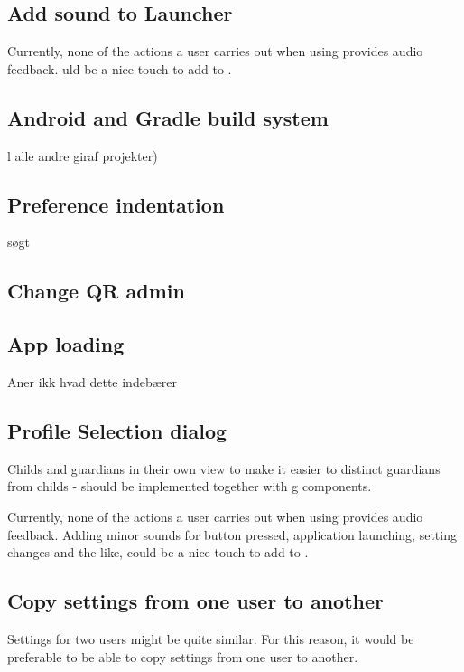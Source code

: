 \subsection{Add sound to Launcher}
Currently, none of the actions a user carries out when using \launcher provides audio feedback.
uld be a nice touch to add to \launcher. 

\subsection{Android and Gradle build system}
l alle andre giraf projekter)

\subsection{Preference indentation}
søgt

\subsection{Change QR admin}

\subsection{App loading}

Aner ikk hvad dette indebærer

\subsection{Profile Selection dialog}
Childs and guardians in their own view to make it easier to distinct guardians from childs - should be implemented together with g components.

Currently, none of the actions a user carries out when using \launcher provides audio feedback.
Adding minor sounds for button pressed, application launching, setting changes and the like, could be a nice touch to add to \launcher. 

\subsection{Copy settings from one user to another}
Settings for two users might be quite similar.
For this reason, it would be preferable to be able to copy settings from one user to another.                                                                                   
                                                                                   

